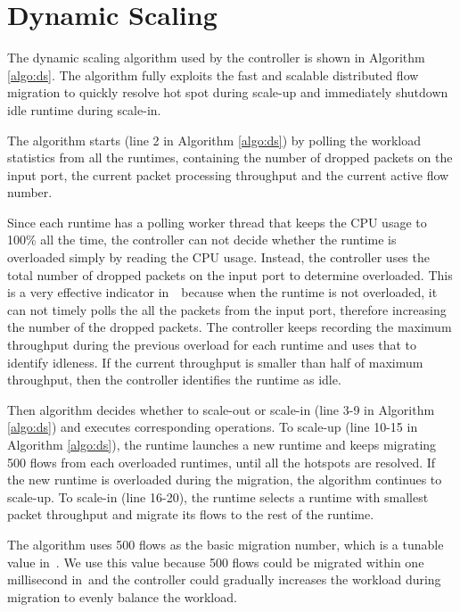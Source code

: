 \section{Dynamic Scaling}

The dynamic scaling algorithm used by the controller is shown in Algorithm \ref{algo:ds}. The algorithm fully exploits the fast and scalable distributed flow migration to quickly resolve hot spot during scale-up and immediately shutdown idle runtime during scale-in.

The algorithm starts (line 2 in Algorithm \ref{algo:ds}) by polling the workload statistics from all the runtimes, containing the number of dropped packets on the input port, the current packet processing throughput and the current active flow number.

Since each runtime has a polling worker thread that keeps the CPU usage to 100\% all the time, the controller can not decide whether the runtime is overloaded simply by reading the CPU usage. Instead, the controller uses the total number of dropped packets on the input port to determine overloaded. This is a very effective indicator in~\nfactor~because when the runtime is not overloaded, it can not timely polls the all the packets from the input port, therefore increasing the number of the dropped packets. The controller keeps recording the maximum throughput during the previous overload for each runtime and uses that to identify idleness. If the current throughput is smaller than half of maximum throughput, then the controller identifies the runtime as idle.

Then algorithm decides whether to scale-out or scale-in (line 3-9 in Algorithm \ref{algo:ds}) and executes corresponding operations. To scale-up (line 10-15 in Algorithm \ref{algo:ds}), the runtime launches a new runtime and keeps migrating 500 flows from each overloaded runtimes, until all the hotspots are resolved. If the new runtime is overloaded during the migration, the algorithm continues to scale-up. To scale-in (line 16-20), the runtime selects a runtime with smallest packet throughput and migrate its flows to the rest of the runtime.

The algorithm uses 500 flows as the basic migration number, which is a tunable value in~\nfactor. We use this value because 500 flows could be migrated within one millisecond in~\nfactor and the controller could gradually increases the workload during migration to evenly balance the workload.



